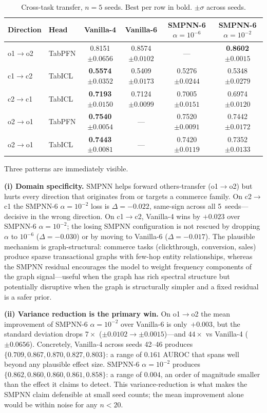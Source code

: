 \documentclass{article}
\begin{document}
\begin{table}[t]
  \caption{Cross-task transfer, $n{=}5$ seeds. Best per row in bold. $\pm\sigma$ across seeds.}
  \label{tab:main}
  \centering
  \small
  \begin{tabular}{@{}llcccc@{}}
    \toprule
    Direction  & Head    & Vanilla-4          & Vanilla-6           & SMPNN-6 $\alpha{=}10^{-6}$ & SMPNN-6 $\alpha{=}10^{-2}$ \\
    \midrule
    o1$\to$o2  & TabPFN  & 0.8151 $\pm 0.0656$ & 0.8574 $\pm 0.0102$ & ---                        & \textbf{0.8602 $\pm 0.0015$} \\
    c1$\to$c2  & TabICL  & \textbf{0.5574 $\pm 0.0352$} & 0.5409 $\pm 0.0173$ & 0.5276 $\pm 0.0244$ & 0.5348 $\pm 0.0279$ \\
    c2$\to$c1  & TabICL  & \textbf{0.7193 $\pm 0.0150$} & 0.7124 $\pm 0.0099$ & 0.7005 $\pm 0.0151$ & 0.6974 $\pm 0.0120$ \\
    o2$\to$o1  & TabPFN  & \textbf{0.7540 $\pm 0.0054$} & ---                 & 0.7520 $\pm 0.0091$ & 0.7442 $\pm 0.0172$ \\
    o2$\to$o1  & TabICL  & \textbf{0.7443 $\pm 0.0081$} & ---                 & 0.7420 $\pm 0.0119$ & 0.7352 $\pm 0.0133$ \\
    \bottomrule
  \end{tabular}
\end{table}

Three patterns are immediately visible.

\textbf{(i) Domain specificity.} SMPNN helps forward others-transfer (o1$\to$o2) but hurts every direction that originates from or targets a commerce family. On c2$\to$c1 the SMPNN-6 $\alpha{=}10^{-2}$ loss is $\Delta = -0.022$, same-sign across all 5~seeds---decisive in the wrong direction. On c1$\to$c2, Vanilla-4 wins by $+0.023$ over SMPNN-6 $\alpha{=}10^{-2}$; the losing SMPNN configuration is not rescued by dropping $\alpha$ to $10^{-6}$ ($\Delta = -0.030$) or by moving to Vanilla-6 ($\Delta = -0.017$). The plausible mechanism is graph-structural: commerce tasks (clickthrough, conversion, sales) produce sparse transactional graphs with few-hop entity relationships, whereas the SMPNN residual encourages the model to weight frequency components of the graph signal---useful when the graph has rich spectral structure but potentially disruptive when the graph is structurally simpler and a fixed residual is a safer prior.

\textbf{(ii) Variance reduction is the primary win.} On o1$\to$o2 the mean improvement of SMPNN-6 $\alpha{=}10^{-2}$ over Vanilla-6 is only~$+0.003$, but the standard deviation drops $7\times$ ($\pm 0.0102 \to \pm 0.0015$)---and $44\times$ vs Vanilla-4 ($\pm 0.0656$). Concretely, Vanilla-4 across seeds 42--46 produces $\{0.709, 0.867, 0.870, 0.827, 0.803\}$: a range of $0.161$ AUROC that spans well beyond any plausible effect size. SMPNN-6 $\alpha{=}10^{-2}$ produces $\{0.862, 0.860, 0.860, 0.861, 0.858\}$: a range of $0.004$, an order of magnitude smaller than the effect it claims to detect. This variance-reduction is what makes the SMPNN claim defensible at small seed counts; the mean improvement alone would be within noise for any $n\!<\!20$.
\end{document}

